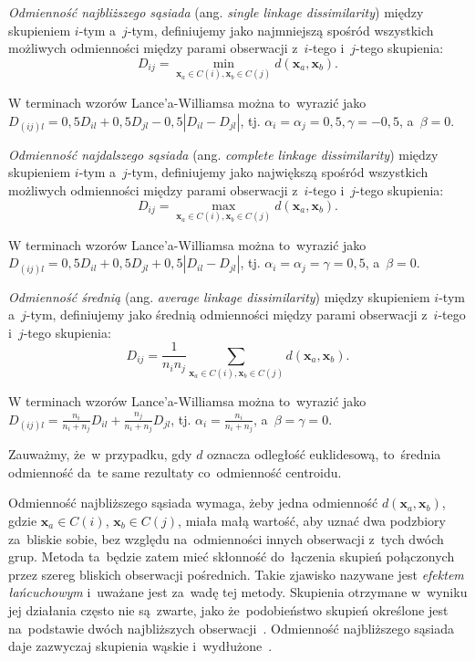 \documentclass{praca1}
\begin{document}
\begin{definition}
\emph{Odmienność najbliższego sąsiada} (ang. \emph{single linkage dissimilarity}) między skupieniem $i$-tym a~$j$-tym, definiujemy jako najmniejszą spośród wszystkich możliwych odmienności między parami obserwacji z~$i$-tego i~$j$-tego skupienia:
$$
D_{ij} = \min\limits_{\mathbf{x}_a \in C(i), \mathbf{x}_b \in C(j)}d(\mathbf{x}_a, \mathbf{x}_b).
$$
\end{definition}

W terminach wzorów Lance'a-Williamsa można to~wyrazić jako $D_{(ij)l} = 0{,}5 D_{il} + 0{,}5 D_{jl} - 0{,}5 |D_{il} - D_{jl}| $, tj. $\alpha_i = \alpha_j =  0{,}5, \gamma = -0{,}5$, a~$\beta = 0$.

\begin{definition}
\emph{Odmienność najdalszego sąsiada} (ang. \emph{complete linkage dissimilarity}) między skupieniem $i$-tym a~$j$-tym, definiujemy jako największą spośród wszystkich możliwych odmienności między parami obserwacji z~$i$-tego i~$j$-tego skupienia:
$$
D_{ij} = \max\limits_{\mathbf{x}_a \in C(i), \mathbf{x}_b \in C(j)}d(\mathbf{x}_a, \mathbf{x}_b).
$$
\end{definition}

W terminach wzorów Lance'a-Williamsa można to~wyrazić jako $D_{(ij)l} = 0{,}5 D_{il} + 0{,}5 D_{jl} + 0{,}5 |D_{il} - D_{jl}| $, tj. $\alpha_i = \alpha_j = \gamma = 0{,}5$, a~$\beta = 0$.

\begin{definition}
\emph{Odmienność średnią} (ang. \emph{average linkage dissimilarity}) między skupieniem $i$-tym a~$j$-tym, definiujemy jako średnią odmienności między parami obserwacji z~$i$-tego i~$j$-tego skupienia:
$$
D_{ij} = \frac{1}{n_i n_j}\sum\limits_{\mathbf{x}_a \in C(i), \mathbf{x}_b \in C(j)}d(\mathbf{x}_a, \mathbf{x}_b).
$$
\end{definition}

W terminach wzorów Lance'a-Williamsa można to~wyrazić jako $D_{(ij)l} = \frac{n_i}{n_i+n_j} D_{il} + \frac{n_j}{n_i+n_j} D_{jl}$, tj. $\alpha_i = \frac{n_i}{n_i+n_j}$, a~$\beta = \gamma = 0$.

Zauważmy, że~w przypadku, gdy $d$ oznacza odległość euklidesową, to~średnia odmienność da~te same rezultaty co~odmienność centroidu.

Odmienność najbliższego sąsiada wymaga, żeby jedna odmienność $d(\mathbf{x}_a, \mathbf{x}_b)$, gdzie $\mathbf{x}_a \in C(i)$, $\mathbf{x}_b \in C(j)$, miała małą wartość, aby uznać dwa podzbiory za~bliskie sobie, bez względu na~odmienności innych obserwacji z~tych dwóch grup. Metoda ta~będzie zatem mieć skłonność do~łączenia skupień połączonych przez szereg bliskich obserwacji pośrednich. Takie zjawisko nazywane jest \emph{efektem łańcuchowym} i~uważane jest za~wadę tej metody. Skupienia otrzymane w~wyniku jej działania często nie są~zwarte, jako że~podobieństwo skupień określone jest na~podstawie dwóch najbliższych obserwacji~\cite{Hastie2009:elements}. Odmienność najbliższego sąsiada daje zazwyczaj skupienia wąskie i~wydłużone~\cite{Koronacki2005:statystyczne}. 
\end{document}
